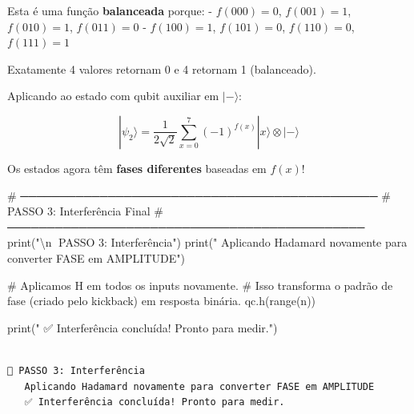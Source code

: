 \documentclass[
  brazilian,
]{report}
\newenvironment{Shaded}{\begin{snugshade}}{\end{snugshade}}
\newcommand{\NormalTok}[1]{\textcolor[rgb]{0.00,0.23,0.31}{#1}}
\begin{document}
Esta é uma função \textbf{balanceada} porque: - \(f(000) = 0\),
\(f(001) = 1\), \(f(010) = 1\), \(f(011) = 0\) - \(f(100) = 1\),
\(f(101) = 0\), \(f(110) = 0\), \(f(111) = 1\)

Exatamente 4 valores retornam 0 e 4 retornam 1 (balanceado).

Aplicando ao estado com qubit auxiliar em \(|-\rangle\):

\[|\psi_2\rangle = \frac{1}{2\sqrt{2}} \sum_{x=0}^{7} (-1)^{f(x)} |x\rangle \otimes |-\rangle\]

Os estados agora têm \textbf{fases diferentes} baseadas em \(f(x)\)!

\begin{Shaded}
\begin{Highlighting}[]


\NormalTok{\# ─────────────────────────────────────────────}
\NormalTok{\# PASSO 3: Interferência Final}
\NormalTok{\# ─────────────────────────────────────────────}
\NormalTok{print("\textbackslash{}n📍 PASSO 3: Interferência")}
\NormalTok{print("   Aplicando Hadamard novamente para converter FASE em AMPLITUDE")}

\NormalTok{\# Aplicamos H em todos os inputs novamente.}
\NormalTok{\# Isso transforma o padrão de fase (criado pelo kickback) em resposta binária.}
\NormalTok{qc.h(range(n))}

\NormalTok{print("   ✅ Interferência concluída! Pronto para medir.")}
\end{Highlighting}
\end{Shaded}

\begin{verbatim}

📍 PASSO 3: Interferência
   Aplicando Hadamard novamente para converter FASE em AMPLITUDE
   ✅ Interferência concluída! Pronto para medir.
\end{verbatim}
\end{document}
